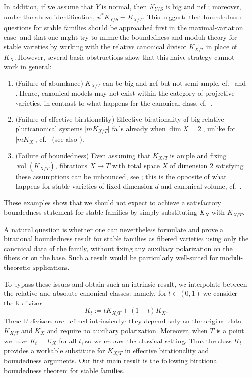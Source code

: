 \documentclass[11pt,reqno]{amsart}
\numberwithin{equation}{section}
\newcommand{\vol}{\operatorname{vol}}
\theoremstyle{definition}
\begin{document}
In addition, if we assume that $Y$ is normal, then $K_{Y/S}$ is big and nef \cite[Proposition~2.15]{PX17}; moreover, under the above identification, $\psi^\ast K_{Y/S}=K_{X/T}$.
This suggests that boundedness questions for stable families should be approached first in the maximal-variation case, and that one might try to mimic the boundedness and moduli theory for stable varieties by working with the relative canonical divisor $K_{X/T}$ in place of $K_X$.
However, several basic obstructions show that this naive strategy cannot work in general:
\begin{enumerate}
    \item (Failure of abundance) $K_{X/T}$ can be big and nef but not semi-ample, cf.~\cite[Example~5.5]{ACSS21} and \cite[Theorem~IV.2.2]{McQ08}. 
    Hence, canonical models may not exist within the category of projective varieties, in contrast to what happens for the canonical class, cf.~\cite[Corollary~1.1.1]{BCHM10}. 
    \item (Failure of effective birationality) Effective birationality of big relative pluricanonical systems 
    $\vert mK_{X/T}\vert$ 
    fails already when $\dim X=2$ \cite[Theorem~1.3]{Lü25}, unlike for $\vert mK_X\vert$, cf.~\cite[Theorem~1.3(3)]{HMX14} (see also \cite{HM06,Tak06,Tsu07}).
    \item (Failure of boundedness) 
    Even assuming that
    $K_{X/T}$ 
    is ample and fixing $\vol(K_{X/T})$, 
    fibrations $X \to T$ with total space $X$ of dimension $2$ satisfying these assumptions can be unbounded, see \cite[Example~4.1]{Pas24}; 
    this is the opposite of what happens for stable varieties of fixed dimension $d$ and canonical volume, cf.~\cite[Theorem~1.1]{HMX18}.
\end{enumerate}
These examples show that we should not expect to achieve a satisfactory boundedness statement for stable families by simply substituting $K_X$ with $K_{X/T}$.

A natural question is whether one can nevertheless formulate and prove a birational boundedness result for stable families as fibered varieties using only the canonical data of the family, without fixing any auxiliary polarization on the fibers or on the base. 
Such a result would be particularly well-suited for moduli-theoretic applications.

To bypass these issues and obtain such an intrinsic result, we interpolate between the relative and absolute canonical classes: namely, for $t\in(0,1)$ we consider the $\mathbb R$-divisor
\[K_t:=tK_{X/T}+(1-t)K_X.\]
These $\mathbb R$-divisors are defined intrinsically: they depend only on the original data $K_{X/T}$ and $K_X$ and require no auxiliary polarization. Moreover, when $T$ is a point we have $K_t=K_X$ for all $t$, so we recover the classical setting. Thus the class $K_t$ provides a workable substitute for $K_{X/T}$ in effective birationality and boundedness arguments. Our first main result is the following birational boundedness theorem for stable families. 
\end{document}
